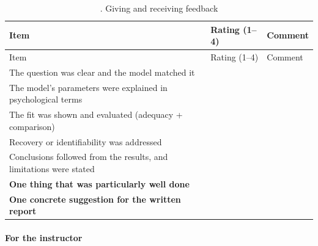 \begin{longtable}[]{@{}
  >{\raggedright\arraybackslash}p{}
  >{\raggedright\arraybackslash}p{}
  >{\raggedright\arraybackslash}p{}@{}}
\caption{. Giving and receiving feedback}\tabularnewline
\toprule\noalign{}
\begin{minipage}[b]{\linewidth}\raggedright
Item
\end{minipage} & \begin{minipage}[b]{\linewidth}\raggedright
Rating (1--4)
\end{minipage} & \begin{minipage}[b]{\linewidth}\raggedright
Comment
\end{minipage} \\
\midrule\noalign{}
\endfirsthead
\toprule\noalign{}
\begin{minipage}[b]{\linewidth}\raggedright
Item
\end{minipage} & \begin{minipage}[b]{\linewidth}\raggedright
Rating (1--4)
\end{minipage} & \begin{minipage}[b]{\linewidth}\raggedright
Comment
\end{minipage} \\
\midrule\noalign{}
\endhead
\bottomrule\noalign{}
\endlastfoot
The question was clear and the model matched it & & \\
The model's parameters were explained in psychological terms & & \\
The fit was shown and evaluated (adequacy + comparison) & & \\
Recovery or identifiability was addressed & & \\
Conclusions followed from the results, and limitations were stated &
& \\
\textbf{One thing that was particularly well done} & & \\
\textbf{One concrete suggestion for the written report} & & \\
\end{longtable}

\paragraph{For the instructor}

